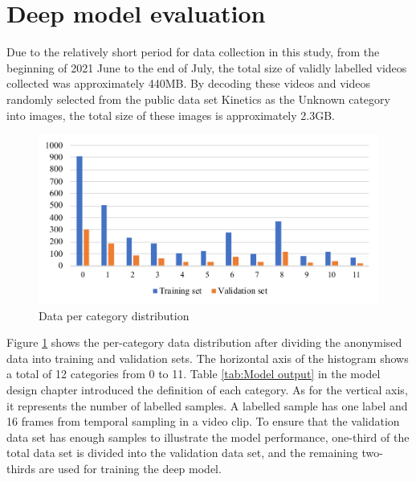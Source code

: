 \section{Deep model evaluation}
\label{sec:Deep model evaluation}
Due to the relatively short period for data collection in this study, from the beginning of 2021 June to the end of July, the total size of validly labelled videos collected was approximately 440MB.
By decoding these videos and videos randomly selected from the public data set Kinetics as the Unknown category into images, the total size of these images is approximately 2.3GB.

\begin{figure}[!ht]
    \centering
    \includegraphics[width=\textwidth]{evaluation/imgs/5-data-dist-diag.pdf}
    \caption{Data per category distribution}
    \label{fig:5-data-dist-diag}
\end{figure}

Figure \ref{fig:5-data-dist-diag} shows the per-category data distribution after dividing the anonymised data into training and validation sets.
The horizontal axis of the histogram shows a total of 12 categories from 0 to 11.
Table \ref{tab:Model output} in the model design chapter introduced the definition of each category.
As for the vertical axis, it represents the number of labelled samples.
A labelled sample has one label and 16 frames from temporal sampling in a video clip.
To ensure that the validation data set has enough samples to illustrate the model performance, one-third of the total data set is divided into the validation data set, and the remaining two-thirds are used for training the deep model.

